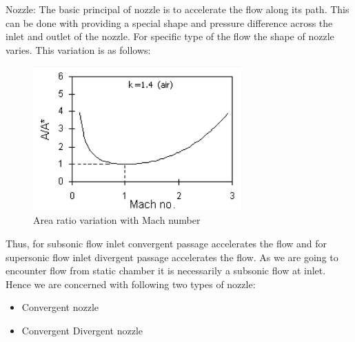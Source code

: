 {\LARGE Nozzle:}
The basic principal of nozzle is to accelerate the flow along its path. This
can be done with providing a special shape and pressure difference across the
inlet and outlet of the nozzle. For specific type of the flow the shape of nozzle
varies. This variation is as follows:
\begin{figure}[!h]
    \centering
    \includegraphics[width=8cm]{areaRatio.png}
    \caption{Area ratio variation with Mach number}
\end{figure}
\newline
Thus, for subsonic flow inlet convergent passage accelerates the flow and for
supersonic flow inlet divergent passage accelerates the flow. As we are going to
encounter flow from static chamber it is necessarily a subsonic flow at inlet.
\newline
Hence we are concerned with following two types of nozzle:
\begin{itemize}
    \item Convergent nozzle
    \item Convergent Divergent nozzle
\end{itemize}
\newpage

